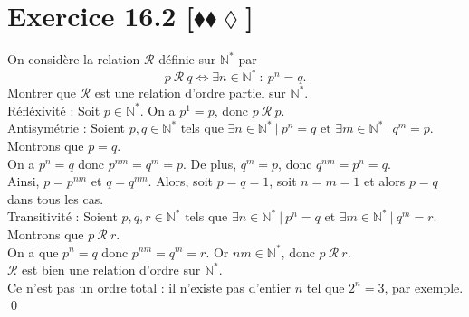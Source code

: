 \documentclass[10pt]{article}
\begin{document}

\section*{Exercice 16.2 [$\blacklozenge\blacklozenge\lozenge$]}
\begin{tcolorbox}[enhanced, width=7.6in, center, size=fbox, fontupper=\large, drop shadow southwest]
    On considère la relation $\mathcal{R}$ définie sur $\mathbb{N}^*$ par
    \begin{equation*}
        p ~ \mathcal{R} ~ q \iff \exists n \in \mathbb{N}^* ~ : ~ p^n = q.
    \end{equation*}
    Montrer que $\mathcal{R}$ est une relation d'ordre partiel sur $\mathbb{N}^*$.\\[0.15cm]
    Réfléxivité : Soit $p \in \mathbb{N}^*$. On a $p^1=p$, donc $p ~ \mathcal{R} ~ p$.\\[0.1cm]
    Antisymétrie : Soient $p,q\in\mathbb{N}^*$ tels que $\exists n \in \mathbb{N}^* ~ | ~ p^n = q$ et $\exists m \in \mathbb{N}^* ~ | ~ q^m = p$. Montrons que $p=q$.\\
    On a $p^n = q$ donc $p^{nm} = q^m = p$. De plus, $q^m = p$, donc $q^{nm} = p^n = q$.\\
    Ainsi, $p = p^{nm}$ et $q=q^{nm}$. Alors, soit $p = q = 1$, soit $n=m=1$ et alors $p=q$ dans tous les cas.\\[0.1cm]
    Transitivité : Soient $p,q,r \in \mathbb{N}^*$ tels que $\exists n \in \mathbb{N}^* ~ | ~ p^n = q$ et $\exists m \in \mathbb{N}^* ~ | ~ q^m = r$. Montrons que $p ~ \mathcal{R} ~ r$.\\
    On a que $p^{n} = q$ donc $p^{nm}=q^m=r$. Or $nm \in \mathbb{N}^*$, donc $p ~ \mathcal{R} ~ r$.\\[0.2cm]
    $\mathcal{R}$ est bien une relation d'ordre sur $\mathbb{N}^*$.\\
    Ce n'est pas un ordre total : il n'existe pas d'entier $n$ tel que $2^n=3$, par exemple.\\
    \qed
\end{tcolorbox}
\end{document}
